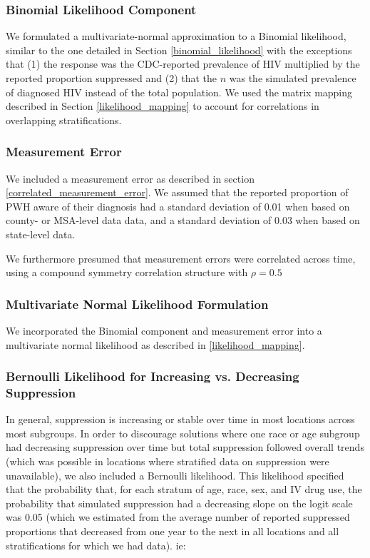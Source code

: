 \documentclass{article}
\begin{document}
\subsubsection{Binomial Likelihood Component}

We formulated a multivariate-normal approximation to a Binomial likelihood, similar to the one detailed in Section \ref{binomial_likelihood} with the exceptions that (1) the response was the CDC-reported prevalence of HIV multiplied by the reported proportion suppressed and (2) that the $n$ was the simulated prevalence of diagnosed HIV instead of the total population. We used the matrix mapping described in Section \ref{likelihood_mapping} to account for correlations in overlapping stratifications.

\subsubsection{Measurement Error}
We included a measurement error as described in section \ref{correlated_measurement_error}. We assumed that the reported proportion of PWH aware of their diagnosis had a standard deviation of 0.01 when based on county- or MSA-level data data, and a standard deviation of 0.03 when based on state-level data.

We furthermore presumed that measurement errors were correlated across time, using a compound symmetry correlation structure with $\rho = 0.5$

\subsubsection{Multivariate Normal Likelihood Formulation}
We incorporated the Binomial component and measurement error into a multivariate normal likelihood as described in \ref{likelihood_mapping}.

\subsubsection{Bernoulli Likelihood for Increasing vs. Decreasing Suppression}
In general, suppression is increasing or stable over time in most locations across most subgroups. In order to discourage solutions where one race or age subgroup had decreasing suppression over time but total suppression followed overall trends (which was possible in locations where stratified data on suppression were unavailable), we also included a Bernoulli likelihood. This likelihood specified that the probability that, for each stratum of age, race, sex, and IV drug use, the probability that simulated suppression had a decreasing slope on the logit scale was 0.05 (which we estimated from the average number of reported suppressed proportions that decreased from one year to the next in all locations and all stratifications for which we had data). ie:
\end{document}
